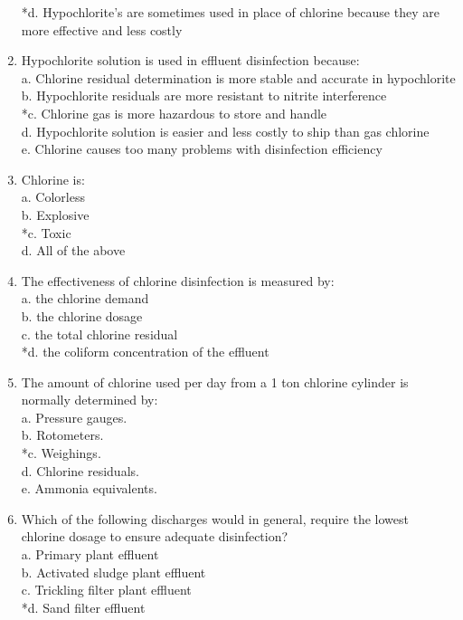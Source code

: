 \begin{enumerate}
*d. Hypochlorite’s are sometimes used in place of chlorine because they are more effective and less costly \\
\item Hypochlorite solution is used in effluent disinfection because: \\
a. Chlorine residual determination is more stable and accurate in hypochlorite \\
b. Hypochlorite residuals are more resistant to nitrite interference \\
*c. Chlorine gas is more hazardous to store and handle \\
d. Hypochlorite solution is easier and less costly to ship than gas chlorine \\
e. Chlorine causes too many problems with disinfection efficiency \\
\item Chlorine is: \\
a. Colorless \\
b. Explosive \\
*c. Toxic \\
d. All of the above \\
\item The effectiveness of chlorine disinfection is measured by: \\
a. the chlorine demand \\
b. the chlorine dosage \\
c. the total chlorine residual \\
*d. the coliform concentration of the effluent \\
\item The amount of chlorine used per day from a 1 ton chlorine cylinder is normally determined by: \\
a. Pressure gauges. \\
b. Rotometers. \\
*c. Weighings. \\
d. Chlorine residuals. \\
e. Ammonia equivalents. \\
\item Which of the following discharges would in general, require the lowest chlorine dosage to ensure adequate disinfection? \\
a. Primary plant effluent \\
b. Activated sludge plant effluent \\
c. Trickling filter plant effluent \\
*d. Sand filter effluent \\

\end{enumerate}
